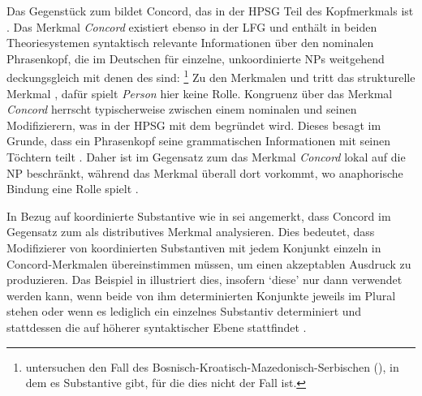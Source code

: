\begin{exe}
\ex\label{ex:coordidx}
\begin{xlist}
\end{xlist}
\end{exe}


\label{phsec:concord}

Das Gegenstück zum  bildet Concord, das in der HPSG Teil des Kopfmerkmals ist
\autocite[17]{wechslerzlatic2003}. Das Merkmal \emph{Concord} existiert ebenso
in der LFG \autocite[189--192]{bresnanetal2016}
und enthält in beiden Theoriesystemen syntaktisch relevante Informationen über
den nominalen Phrasenkopf, die im Deutschen für
einzelne, unkoordinierte NPs weitgehend deckungsgleich mit
denen des  sind:%
%
	\footnote{\citet{wechslerzlatic2003} untersuchen den Fall des
	Bosnisch-Kroatisch-Mazedonisch-Serbischen (), in dem es
	Substantive gibt, für die dies nicht der Fall ist.}
%
Zu den Merkmalen \emph{} und \emph{} tritt das
strukturelle Merkmal \emph{}, dafür spielt \emph{Person} hier keine
Rolle. Kongruenz über das Merkmal \emph{Concord} herrscht typischerweise
zwischen einem nominalen  und seinen Modifizierern, was in der
HPSG mit dem  begründet wird. Dieses besagt im Grunde, dass ein
Phrasenkopf seine grammatischen Informationen mit seinen Töchtern
teilt \autocites[vgl.][34]{pollardsag1994}[22]{wechslerzlatic2003}. Daher ist
im Gegensatz zum  das Merkmal \emph{Concord} lokal auf die
NP beschränkt, während das Merkmal \emph{} überall
dort vorkommt, wo anaphorische Bindung eine Rolle
spielt \parencites[14--16, 22]{wechslerzlatic2003}[189]{bresnanetal2016}.

In Bezug auf koordinierte Substantive wie in
 sei angemerkt, dass \citet[76--78]{kingdalrymple2004} Concord
im Gegensatz zum  als distributives Merkmal analysieren. Dies
bedeutet, dass Modifizierer von koordinierten Substantiven mit jedem Konjunkt
einzeln in Concord-Merkmalen übereinstimmen müssen, um einen akzeptablen
Ausdruck zu produzieren. Das Beispiel in  illustriert
dies, insofern  `diese' nur dann verwendet werden kann, wenn beide
von ihm determinierten Konjunkte jeweils im Plural stehen
 oder wenn es lediglich ein einzelnes Substantiv
determiniert und stattdessen die  auf höherer syntaktischer
Ebene stattfindet .

